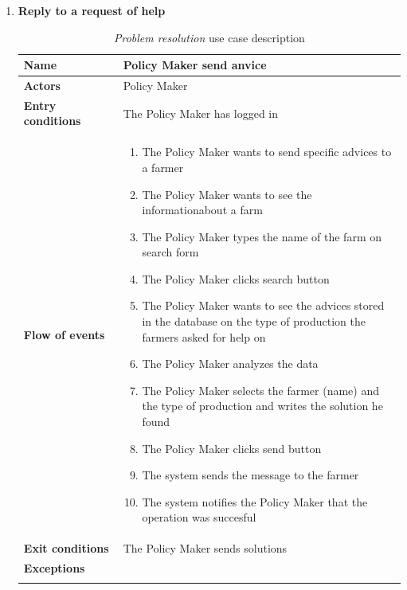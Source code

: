 \begin{enumerate}
    \item \textbf{Reply to a request of help}
    \begin{longtable}{p{0.26\linewidth}p{0.75\linewidth}}
        \toprule
        \textbf{Name} & \textbf{Policy Maker send anvice} \\
        \midrule
        \textbf{Actors} & Policy Maker \\
        \midrule
        \textbf{Entry conditions} & The Policy Maker has logged in\\
        \midrule
        \textbf{Flow of events} & 
        \begin{enumerate}
            \item The Policy Maker wants to send specific advices to a farmer
            \item The Policy Maker wants to see the informationabout a farm
            \item The Policy Maker types the name of the farm on search form
            \item The Policy Maker clicks search button 
            \item The Policy Maker wants to see the advices stored in the database on the type of production the farmers asked for help on
            \item The Policy Maker analyzes the data 
            \item The Policy Maker selects the farmer (name) and the type of production and writes the solution he found
            \item The Policy Maker clicks send button
            \item The system sends the message to the farmer
            \item The system notifies the Policy Maker that the operation was succesful
        \end{enumerate} \\
        \midrule
        \textbf{Exit conditions} & The Policy Maker sends solutions\\
        \midrule
        \textbf{Exceptions} & \\
        \bottomrule
        \caption{\emph{Problem resolution} use case description}
    \end{longtable}


\end{enumerate}
